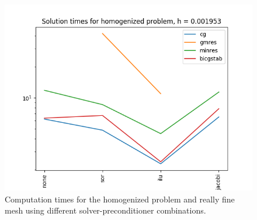 \documentclass{article}
\begin{document}
  \begin{figure}[h]
    \centering
    \includegraphics[width=0.8\linewidth]{solution_times_homogenized_tiny_h.png}
    \caption{Computation times for the homogenized problem and really fine mesh using different solver-preconditioner combinations.}
    \label{fig:solution_times_full_tiny_h}
  \end{figure}
\end{document}
